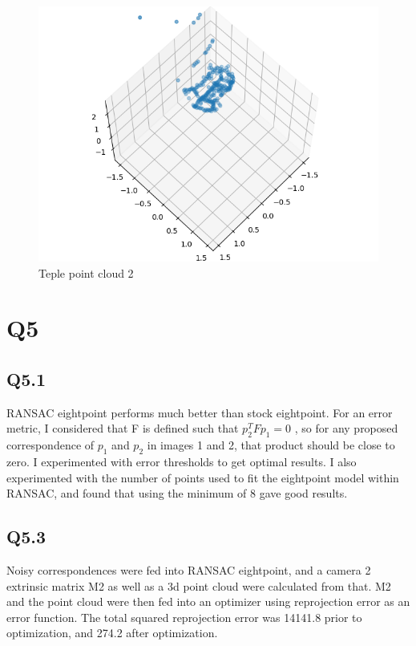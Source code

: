 \documentclass[12pt]{article}
\begin{document}
\begin{figure}[H]
\centering
\includegraphics[page=1,width=1\textwidth]{q4_2b}
\caption{Teple point cloud 2 } 
\label{fig:3d2}
\end{figure}   

\newpage
\section{Q5}
\subsection{Q5.1}
RANSAC eightpoint performs much better than stock eightpoint. For an error metric, I considered that F is defined such that $p_{2}^{T} F p_{1} = 0$ , so for any proposed correspondence of $p_{1}$ and $p_{2}$ in images 1 and 2, that product should be close to zero. I experimented with error thresholds to get optimal results. I also experimented with the number of points used to fit the eightpoint model within RANSAC, and found that using the minimum of 8 gave good results.


\newpage
\subsection{Q5.3}
Noisy correspondences were fed into RANSAC eightpoint, and a camera 2 extrinsic matrix M2 as well as a 3d point cloud were calculated from that. M2 and the point cloud were then fed into an optimizer using reprojection error as an error function. The total squared reprojection error was 14141.8 prior to optimization, and 274.2 after optimization.  
    
\end{document}
